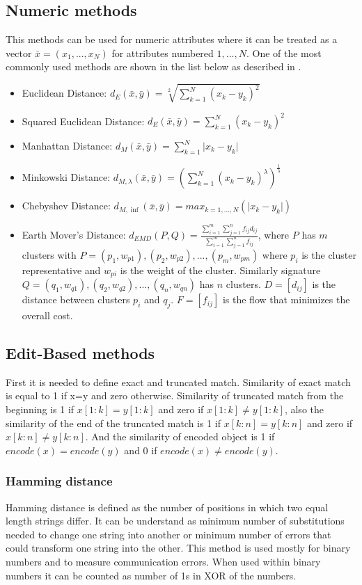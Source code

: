 \subsection{Numeric methods}
This methods can be used for numeric attributes where it can be treated as a vector $\bar{x}=(x_1,...,x_N)$ for attributes numbered $1,...,N$. One of the most commonly used methods are shown in the list below as described in \cite{simvzorecky}.
\begin{itemize}
\item Euclidean Distance: $d_E (\bar{x},\bar{y})=\sqrt[2]{\sum_{k=1}^N (x_k-y_k)^2} $
\item Squared Euclidean Distance: $d_E (\bar{x},\bar{y})=\sum_{k=1}^N (x_k-y_k)^2 $
\item Manhattan Distance: $d_M (\bar{x},\bar{y})=\sum_{k=1}^N 
{\lvert x_k-y_k \rvert}$
\item Minkowski Distance: $d_{M,\lambda} (\bar{x},\bar{y})=(\sum_{k=1}^N (x_k-y_k)^\lambda)^{\frac{1}{\lambda}} $
\item Chebyshev Distance: $d_{M,\inf} (\bar{x},\bar{y})=max_{k=1,...,N}(\lvert x_k-y_k \rvert) $
\item Earth Mover's Distance: $d_{EMD}(P,Q)=\frac{\sum_{i=1}^m\sum_{j=1}^n f_{ij}d_{ij}}{\sum_{i=1}^m\sum_{j=1}^n f_{ij}}$, where $P$ has $m$ clusters with $P={(p_1, w_{p1}), (p_2, w_{p2}),...,(p_m, w_{pm})}$ where $p_i$ is the cluster representative and $w_{pi}$ is the weight of the cluster. Similarly signature $Q={(q_1, w_{q1}), (q_2, w_{q2}),...,(q_n, w_{qn})}$ has $n$ clusters. $D=[d_{ij}]$ is the distance between clusters $p_i$ and $q_j$. $F=[f_{ij}]$ is the flow that minimizes the overall cost.
\end{itemize}

\subsection{Edit-Based methods}
First it is needed to define exact and truncated match. Similarity of exact match is equal to 1 if x=y and zero otherwise. Similarity of truncated match from the beginning is 1 if $x[1:k] = y[1:k]$ and zero if $x[1:k] \neq y[1:k]$, also the similarity of the end of the truncated match is 1 if $x[k:n] = y[k:n]$ and zero if $x[k:n] \neq y[k:n]$. And the similarity of encoded object is 1 if $encode(x)=encode(y)$ and 0 if $encode(x) \neq encode (y)$. \cite{sim2Dstrings}
\subsubsection{Hamming distance}
Hamming distance is defined as the number of positions in which two equal length strings differ. It can be understand as minimum number of substitutions needed to change one string into another or minimum number of errors that could transform one string into the other.
This method is used mostly for binary numbers and to measure communication errors. When used within binary numbers it can be counted as number of 1s in XOR of the numbers. \cite{hamming}

